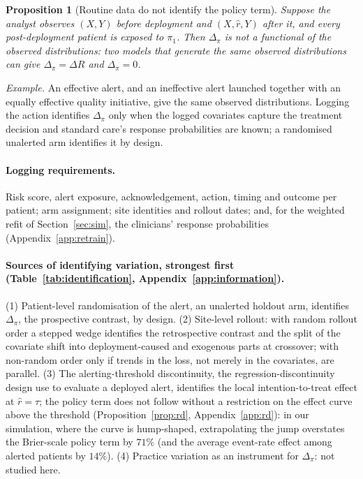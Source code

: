 \documentclass[letterpaper]{article} %
\newtheorem{proposition}{Proposition}
\newcommand{\rhat}{\hat r}
\begin{document}
\begin{proposition}[Routine data do not identify the policy term]
\label{prop:nonid}
Suppose the analyst observes $(X, Y)$ before deployment and $(X, \rhat, Y)$
after it, and every post-deployment patient is exposed to $\pi_1$. Then
$\Delta_\pi$ is not a functional of the observed distributions: two models
that generate the same observed distributions can give
$\Delta_\pi = \Delta R$ and $\Delta_\pi = 0$.
\end{proposition}

\noindent\emph{Example.} An effective alert, and an ineffective alert
launched together with an equally effective quality initiative, give the
same observed distributions. Logging the
action identifies $\Delta_\pi$ only when the logged covariates capture the
treatment decision and standard care's response probabilities are known; a
randomised unalerted arm identifies it by design.

\paragraph{Logging requirements.} Risk score, alert exposure, acknowledgement,
action, timing and outcome per patient; arm assignment; site identities and
rollout dates; and, for the weighted refit of Section~\ref{sec:sim}, the
clinicians' response probabilities (Appendix~\ref{app:retrain}).

\paragraph{Sources of identifying variation, strongest first
(Table~\ref{tab:identification}, Appendix~\ref{app:information}).}
(1) Patient-level randomisation of the alert, an unalerted holdout arm,
identifies $\Delta_\pi$, the prospective contrast, by design.
(2) Site-level rollout: with random rollout order a stepped wedge identifies
the retrospective contrast and the split of the covariate shift into
deployment-caused and exogenous parts at crossover; with non-random order only
if trends in the loss, not merely in the covariates, are parallel.
(3) The alerting-threshold discontinuity, the regression-discontinuity design
\citet{gallo2024effectiveness} use to evaluate a deployed alert, identifies
the local intention-to-treat effect at $\rhat = \tau$; the policy term does
not follow without a restriction on the effect curve above the threshold
(Proposition~\ref{prop:rd}, Appendix~\ref{app:rd}): in our simulation,
where the curve is hump-shaped, extrapolating the jump overstates the
Brier-scale policy term by $71\%$ (and the average event-rate effect among
alerted patients by $14\%$).
(4) Practice variation as an instrument for $\Delta_\pi$: not studied here.
\end{document}
